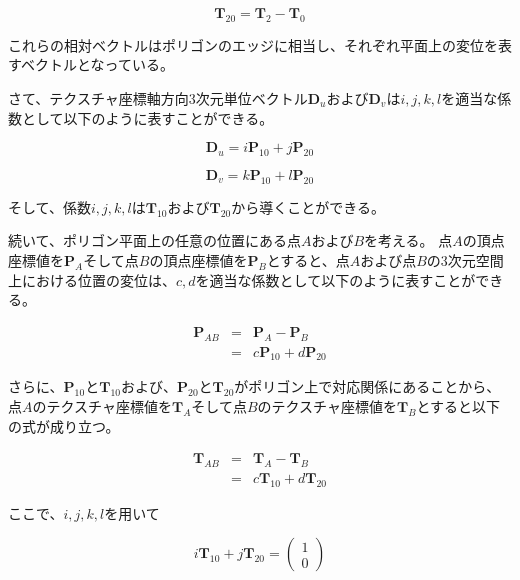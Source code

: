 \begin{equation}
\bm{T}_{20} = \bm{T}_2 - \bm{T}_0
\label{ET20}
\end{equation}

\noindent
これらの相対ベクトルはポリゴンのエッジに相当し、それぞれ平面上の変位を表すベクトルとなっている。

さて、テクスチャ座標軸方向3次元単位ベクトル$\bm{D}_u$および$\bm{D}_v$は$i,j,k,l$を適当な係数として以下のように表すことができる。

\begin{equation}
\bm{D}_u = i\bm{P}_{10} + j\bm{P}_{20}
\label{EUp}
\end{equation}

\begin{equation}
\bm{D}_v = k\bm{P}_{10} + l\bm{P}_{20}
\label{EVp}
\end{equation}

\noindent
そして、係数$i,j,k,l$は$\bm{T}_{10}$および$\bm{T}_{20}$から導くことができる。



続いて、ポリゴン平面上の任意の位置にある点$A$および$B$を考える。%
点$A$の頂点座標値を$\bm{P}_A$そして点$B$の頂点座標値を$\bm{P}_B$とすると、点$A$および点$B$の3次元空間上における位置の変位は、$c,d$を適当な係数として以下のように表すことができる。

\begin{eqnarray}
\bm{P}_{AB} &=& \bm{P}_A - \bm{P}_B\nonumber\\
           &=& c\bm{P}_{10} +  d\bm{P}_{20}  
\label{EPab}
\end{eqnarray}

\noindent
さらに、$\bm{P}_{10}$と$\bm{T}_{10}$および、$\bm{P}_{20}$と$\bm{T}_{20}$がポリゴン上で対応関係にあることから、点$A$のテクスチャ座標値を$\bm{T}_A$そして点$B$のテクスチャ座標値を$\bm{T}_B$とすると以下の式が成り立つ。

\begin{eqnarray}
\bm{T}_{AB} &=& \bm{T}_A - \bm{T}_B\nonumber\\
           &=& c\bm{T}_{10} +  d\bm{T}_{20}  
\label{ETab}
\end{eqnarray}

\noindent
ここで、$i,j,k,l$を用いて

\begin{equation}
i\bm{T}_{10} + j\bm{T}_{20} = 
\begin{pmatrix}
1\\
0
\end{pmatrix}
\label{EUnit2u}
\end{equation}

